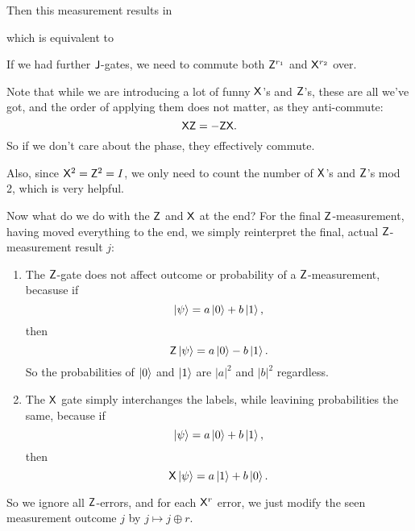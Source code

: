\begin{eg}
\begin{center}
  \end{center}
  Then this measurement results in
  \begin{center}
  \end{center}
  which is equivalent to
  \begin{center}
  \end{center}
  If we had further $\mathsf{J}$-gates, we need to commute both $\mathsf{Z}^{r_1}$ and $\mathsf{X}^{r_2}$ over.

  Note that while we are introducing a lot of funny $\mathsf{X}$'s and $\mathsf{Z}$'s, these are all we've got, and the order of applying them does not matter, as they anti-commute:
  \[
    \mathsf{X}\mathsf{Z} = -\mathsf{Z}\mathsf{X}.
  \]
  So if we don't care about the phase, they effectively commute.

  Also, since $\mathsf{X}^2 = \mathsf{Z}^2 = I$, we only need to count the number of $\mathsf{X}$'s and $\mathsf{Z}$'s mod 2, which is very helpful.

  Now what do we do with the $\mathsf{Z}$ and $\mathsf{X}$ at the end? For the final $\mathsf{Z}$-measurement, having moved everything to the end, we simply reinterpret the final, actual $\mathsf{Z}$-measurement result $j$:
  \begin{enumerate}
    \item The $\mathsf{Z}$-gate does not affect outcome or probability of a $\mathsf{Z}$-measurement, becasuse if
      \[
        \left\lvert \psi\right\rangle = a \left\lvert 0\right\rangle + b \left\lvert 1\right\rangle,
      \]
      then
      \[
        \mathsf{Z} \left\lvert \psi\right\rangle = a \left\lvert 0\right\rangle - b \left\lvert 1\right\rangle.
      \]
      So the probabilities of $\left\lvert 0\right\rangle$ and $\left\lvert 1\right\rangle$ are $|a|^2$ and $|b|^2$ regardless.

    \item The $\mathsf{X}$ gate simply interchanges the labels, while leavining probabilities the same, because if
      \[
        \left\lvert \psi\right\rangle = a \left\lvert 0\right\rangle + b \left\lvert 1\right\rangle,
      \]
      then
      \[
        \mathsf{X} \left\lvert \psi\right\rangle = a \left\lvert 1\right\rangle + b \left\lvert 0\right\rangle.
      \]
  \end{enumerate}
  So we ignore all $\mathsf{Z}$-errors, and for each $\mathsf{X}^r$ error, we just modify the seen measurement outcome $j$ by $j \mapsto j \oplus r$.
\end{eg}

